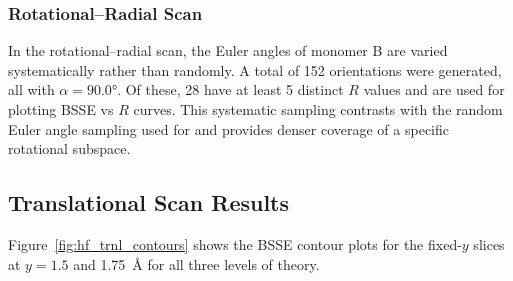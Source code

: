 \subsubsection{Rotational--Radial Scan}

In the rotational--radial scan, the Euler angles of monomer B are
varied systematically rather than randomly. A total of 152
orientations were generated, all with $\alpha = 90.0°$. Of these, 28
have at least 5 distinct $R$ values and are used for plotting BSSE
vs $R$ curves. This systematic sampling contrasts with the random
Euler angle sampling used for  and provides denser coverage
of a specific rotational subspace.

\subsection{Translational Scan Results}

Figure~\ref{fig:hf_trnl_contours} shows the BSSE contour plots for
the fixed-$y$ slices at $y = 1.5$ and \SI{1.75}{\angstrom} for all
three levels of theory.

